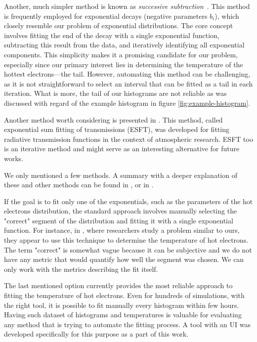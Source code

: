Another, much simpler method is known as \textit{successive subtraction}~\cite{wiscombe1977}. This method is frequently employed for exponential decays (negative parameters $b_i$), which closely resemble our problem of exponential distributions. The core concept involves fitting the end of the decay with a single exponential function, subtracting this result from the data, and iteratively identifying all exponential components. This simplicity makes it a promising candidate for our problem, especially since our primary interest lies in determining the temperature of the hottest electrons—the tail. However, automating this method can be challenging, as it is not straightforward to select an interval that can be fitted as a tail in each iteration. What is more, the tail of our histograms are not reliable as was discussed with regard of the example histogram in figure \ref{fig:example-histogram}.

Another method worth considering is presented in \cite{wiscombe1977}. This method, called exponential sum fitting of transmissions (ESFT), was developed for fitting radiative transmission functions in the context of atmospheric research. ESFT too is an iterative method and might serve as an interesting alternative for future works.

We only mentioned a few methods. A summary with a deeper explanation of these and other methods can be found in \cite{wiscombe1977}, \cite{holmstrom2002} or in \cite{hokanson2013}.

If the goal is to fit only one of the exponentials, such as the parameters of the hot electrons distribution, the standard approach involves manually selecting the "correct" segment of the distribution and fitting it with a single exponential function. For instance, in \cite{cui2013}, where researchers study a problem similar to ours, they appear to use this technique to determine the temperature of hot electrons. The term "correct" is somewhat vague because it can be subjective and we do not have any metric that would quantify how well the segment was chosen. We can only work with the metrics describing the fit itself.

The last mentioned option currently provides the most reliable approach to fitting the temperature of hot electrons. Even for hundreds of simulations, with the right tool, it is possible to fit manually every histogram within few hours. Having such dataset of histograms and temperatures is valuable for evaluating any method that is trying to automate the fitting process. A tool with an UI was developed specifically for this purpose as a part of this work.

